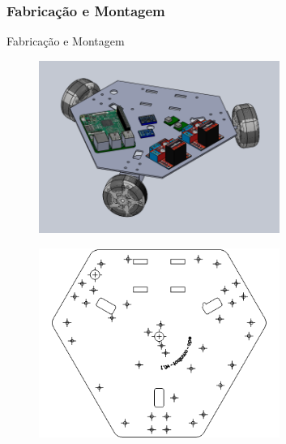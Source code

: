 \documentclass{beamer}
\begin{document}
\subsubsection{Fabricação e Montagem}
\begin{frame}{Fabricação e Montagem}
  \begin{figure}[h]
    \centering
    \includegraphics[width = 0.7\textwidth]{imagens/proto01}
  \end{figure}
\end{frame}
\begin{frame}
  \begin{figure}[h]
    \centering
    \includegraphics[width = 0.7\textwidth]{imagens/chassidxf}
  \end{figure}
\end{frame}
\end{document}
